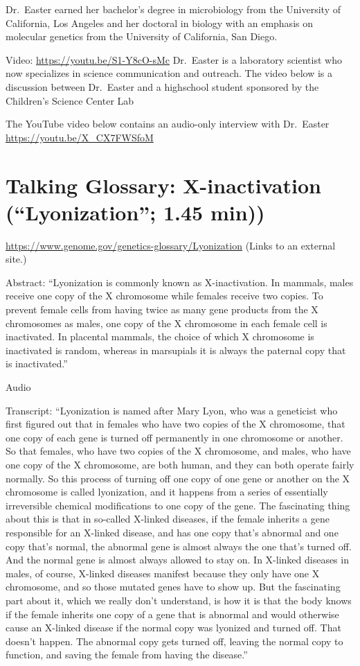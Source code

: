 \documentclass[
]{book}
\begin{document}
Dr.~Easter earned her bachelor's degree in microbiology from the University of California, Los Angeles and her doctoral in biology with an emphasis on molecular genetics from the University of California, San Diego.

Video: \url{https://youtu.be/S1-Y8cO-sMc}
Dr.~Easter is a laboratory scientist who now specializes in science communication and outreach. The video below is a discussion between Dr.~Easter and a highschool student sponsored by the Children's Science Center Lab

The YouTube video below contains an audio-only interview with Dr.~Easter
\url{https://youtu.be/X_CX7FWSfoM}

\hypertarget{talking-glossary-x-inactivation-lyonization-1.45-min}{%
\section{Talking Glossary: X-inactivation (``Lyonization''; 1.45 min))}\label{talking-glossary-x-inactivation-lyonization-1.45-min}}

\url{https://www.genome.gov/genetics-glossary/Lyonization} (Links to an external site.)

Abstract: ``Lyonization is commonly known as X-inactivation. In mammals, males receive one copy of the X chromosome while females receive two copies. To prevent female cells from having twice as many gene products from the X chromosomes as males, one copy of the X chromosome in each female cell is inactivated. In placental mammals, the choice of which X chromosome is inactivated is random, whereas in marsupials it is always the paternal copy that is inactivated.''

Audio

Transcript: ``Lyonization is named after Mary Lyon, who was a geneticist who first figured out that in females who have two copies of the X chromosome, that one copy of each gene is turned off permanently in one chromosome or another. So that females, who have two copies of the X chromosome, and males, who have one copy of the X chromosome, are both human, and they can both operate fairly normally. So this process of turning off one copy of one gene or another on the X chromosome is called lyonization, and it happens from a series of essentially irreversible chemical modifications to one copy of the gene. The fascinating thing about this is that in so-called X-linked diseases, if the female inherits a gene responsible for an X-linked disease, and has one copy that's abnormal and one copy that's normal, the abnormal gene is almost always the one that's turned off. And the normal gene is almost always allowed to stay on. In X-linked diseases in males, of course, X-linked diseases manifest because they only have one X chromosome, and so those mutated genes have to show up. But the fascinating part about it, which we really don't understand, is how it is that the body knows if the female inherits one copy of a gene that is abnormal and would otherwise cause an X-linked disease if the normal copy was lyonized and turned off. That doesn't happen. The abnormal copy gets turned off, leaving the normal copy to function, and saving the female from having the disease.''
\end{document}
